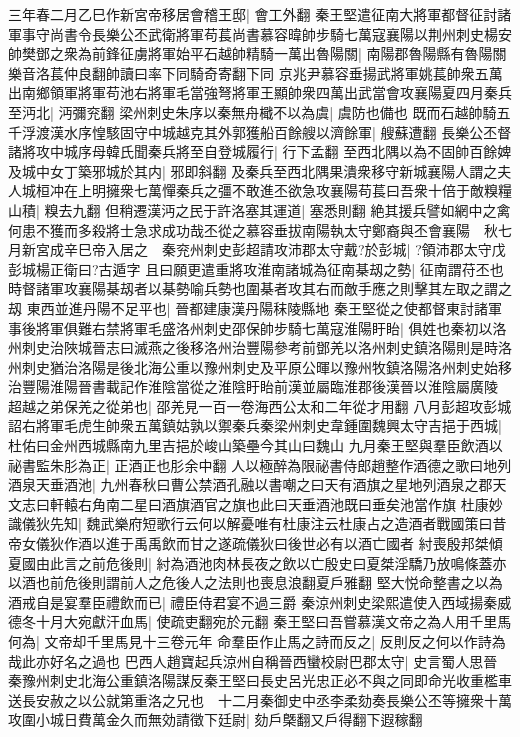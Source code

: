 三年春二月乙巳作新宮帝移居會稽王邸|{
	會工外翻}
秦王堅遣征南大將軍都督征討諸軍事守尚書令長樂公丕武衛將軍苟萇尚書慕容暐帥步騎七萬寇襄陽以荆州刺史楊安帥樊鄧之衆為前鋒征虜將軍始平石越帥精騎一萬出魯陽關|{
	南陽郡魯陽縣有魯陽關樂音洛萇仲良翻帥讀曰率下同騎奇寄翻下同}
京兆尹慕容垂揚武將軍姚萇帥衆五萬出南鄉領軍將軍苟池右將軍毛當強弩將軍王顯帥衆四萬出武當會攻襄陽夏四月秦兵至沔北|{
	沔彌兖翻}
梁州刺史朱序以秦無舟檝不以為虞|{
	虞防也備也}
既而石越帥騎五千浮渡漢水序惶駭固守中城越克其外郭獲船百餘艘以濟餘軍|{
	艘蘇遭翻}
長樂公丕督諸將攻中城序母韓氏聞秦兵將至自登城履行|{
	行下孟翻}
至西北隅以為不固帥百餘婢及城中女丁築邪城於其内|{
	邪即斜翻}
及秦兵至西北隅果潰衆移守新城襄陽人謂之夫人城桓冲在上明擁衆七萬憚秦兵之彊不敢進丕欲急攻襄陽苟萇曰吾衆十倍于敵糗糧山積|{
	糗去九翻}
但稍遷漢沔之民于許洛塞其運道|{
	塞悉則翻}
絶其援兵譬如網中之禽何患不獲而多殺將士急求成功哉丕從之慕容垂拔南陽執太守鄭裔與丕會襄陽　秋七月新宮成辛巳帝入居之　秦兖州刺史彭超請攻沛郡太守戴?於彭城|{
	?領沛郡太守戊彭城楊正衛曰?古遁字}
且曰願更遣重將攻淮南諸城為征南棊刼之勢|{
	征南謂苻丕也時督諸軍攻襄陽棊刼者以棊勢喻兵勢也圍棊者攻其右而敵手應之則擊其左取之謂之刼}
東西並進丹陽不足平也|{
	晉都建康漢丹陽秣陵縣地}
秦王堅從之使都督東討諸軍事後將軍俱難右禁將軍毛盛洛州刺史邵保帥步騎七萬寇淮陽盱眙|{
	俱姓也秦初以洛州刺史治陜城晉志曰滅燕之後移洛州治豐陽參考前鄧羌以洛州刺史鎮洛陽則是時洛州刺史猶治洛陽是後北海公重以豫州刺史及平原公暉以豫州牧鎮洛陽洛州刺史始移治豐陽淮陽晉書載記作淮陰當從之淮陰盱眙前漢並屬臨淮郡後漢晉以淮陰屬廣陵}
超越之弟保羌之從弟也|{
	邵羌見一百一卷海西公太和二年從才用翻}
八月彭超攻彭城詔右將軍毛虎生帥衆五萬鎮姑孰以禦秦兵秦梁州刺史韋鍾圍魏興太守吉挹于西城|{
	杜佑曰金州西城縣南九里吉挹於峻山築壘今其山曰魏山}
九月秦王堅與羣臣飲酒以祕書監朱肜為正|{
	正酒正也肜余中翻}
人以極醉為限祕書侍郎趙整作酒德之歌曰地列酒泉天垂酒池|{
	九州春秋曰曹公禁酒孔融以書嘲之曰天有酒旗之星地列酒泉之郡天文志曰軒轅右角南二星曰酒旗酒官之旗也此曰天垂酒池既曰垂矣池當作旗}
杜康妙識儀狄先知|{
	魏武樂府短歌行云何以解憂唯有杜康注云杜康占之造酒者戰國策曰昔帝女儀狄作酒以進于禹禹飲而甘之遂疏儀狄曰後世必有以酒亡國者}
紂喪殷邦桀傾夏國由此言之前危後則|{
	紂為酒池肉林長夜之飲以亡殷史曰夏桀淫驕乃放鳴條蓋亦以酒也前危後則謂前人之危後人之法則也喪息浪翻夏戶雅翻}
堅大悦命整書之以為酒戒自是宴羣臣禮飲而已|{
	禮臣侍君宴不過三爵}
秦涼州刺史梁熙遣使入西域揚秦威德冬十月大宛獻汗血馬|{
	使疏吏翻宛於元翻}
秦王堅曰吾嘗慕漢文帝之為人用千里馬何為|{
	文帝却千里馬見十三卷元年}
命羣臣作止馬之詩而反之|{
	反則反之何以作詩為哉此亦好名之過也}
巴西人趙寶起兵涼州自稱晉西蠻校尉巴郡太守|{
	史言蜀人思晉}
秦豫州刺史北海公重鎮洛陽謀反秦王堅曰長史呂光忠正必不與之同即命光收重檻車送長安赦之以公就第重洛之兄也　十二月秦御史中丞李柔劾奏長樂公丕等擁衆十萬攻圍小城日費萬金久而無効請徵下廷尉|{
	劾戶槩翻又戶得翻下遐稼翻}

